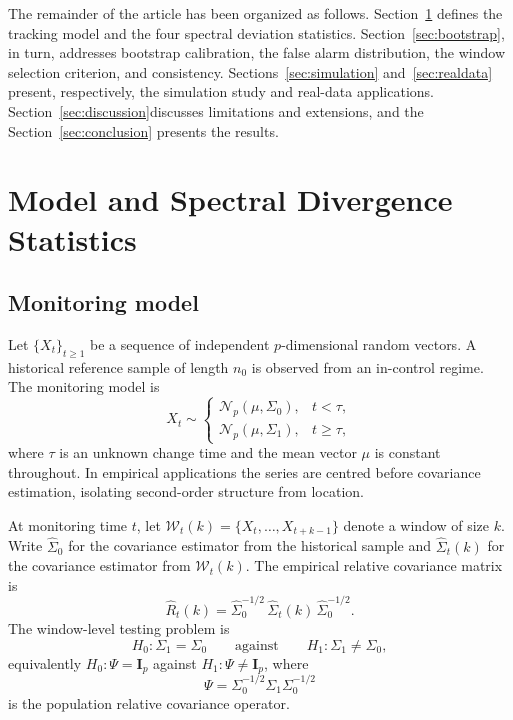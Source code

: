 \documentclass[11pt,a4paper]{article}
\newcommand{\I}{\mathbf{I}}
\newcommand{\calN}{\mathcal{N}}
\newcommand{\calW}{\mathcal{W}}
\begin{document}
The remainder of the article has been organized as follows.
Section~\ref{sec:model} defines the tracking model and the four spectral
deviation statistics. Section~\ref{sec:bootstrap}, in turn, addresses bootstrap
calibration, the false alarm distribution, the window selection criterion, and
consistency.  Sections~\ref{sec:simulation} and~\ref{sec:realdata} present, respectively,
the simulation study and real-data applications.
Section~\ref{sec:discussion}discusses limitations and extensions, and
the Section~\ref{sec:conclusion} presents the results.

\section{Model and Spectral Divergence Statistics}
\label{sec:model}

\subsection{Monitoring model}

Let $\{X_{t}\}_{t\geq 1}$ be a sequence of independent $p$-dimensional
random vectors.  A historical reference sample of length $n_{0}$ is observed
from an in-control regime.  The monitoring model is
\begin{equation}
X_{t} \sim
\begin{cases}
  \calN_{p}(\mu,\Sigma_{0}), & t < \tau,\\
  \calN_{p}(\mu,\Sigma_{1}), & t \geq \tau,
\end{cases}
\label{eq:model}
\end{equation}
where $\tau$ is an unknown change time and the mean vector $\mu$ is constant
throughout.  In empirical applications the series are centred before covariance
estimation, isolating second-order structure from location.

At monitoring time $t$, let $\calW_{t}(k)=\{X_{t},\ldots,X_{t+k-1}\}$ denote
a window of size $k$.  Write $\widehat{\Sigma}_{0}$ for the covariance estimator
from the historical sample and $\widehat{\Sigma}_{t}(k)$ for the covariance
estimator from $\calW_{t}(k)$.  The empirical relative covariance matrix is
\begin{equation}
\widehat{R}_{t}(k)
= \widehat{\Sigma}_{0}^{-1/2}\,\widehat{\Sigma}_{t}(k)\,\widehat{\Sigma}_{0}^{-1/2}.
\label{eq:Rhat}
\end{equation}
The window-level testing problem is
\begin{equation}
H_{0}: \Sigma_{1}=\Sigma_{0}
\qquad\text{against}\qquad
H_{1}: \Sigma_{1}\neq\Sigma_{0},
\label{eq:hypothesis}
\end{equation}
equivalently $H_{0}:\Psi=\I_{p}$ against $H_{1}:\Psi\neq\I_{p}$, where
\begin{equation}
\Psi = \Sigma_{0}^{-1/2}\Sigma_{1}\Sigma_{0}^{-1/2}
\label{eq:relative-pop}
\end{equation}
is the population relative covariance operator.
\end{document}
